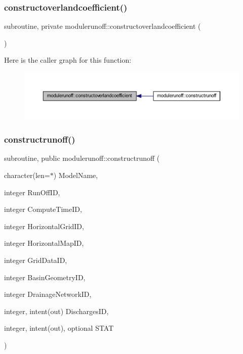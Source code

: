\subsubsection{\texorpdfstring{constructoverlandcoefficient()}{constructoverlandcoefficient()}}
{\footnotesize\ttfamily subroutine, private modulerunoff\+::constructoverlandcoefficient (\begin{DoxyParamCaption}{ }\end{DoxyParamCaption})\hspace{0.3cm}{\ttfamily [private]}}

Here is the caller graph for this function\+:\nopagebreak
\begin{figure}[H]
\begin{center}
\leavevmode
\includegraphics[width=350pt]{namespacemodulerunoff_a9750562ffa96a2b097ee6cfb440440ec_icgraph}
\end{center}
\end{figure}
\mbox{\label{namespacemodulerunoff_afd5b620864c9f62a5b0258956c609766}} 
\subsubsection{\texorpdfstring{constructrunoff()}{constructrunoff()}}
{\footnotesize\ttfamily subroutine, public modulerunoff\+::constructrunoff (\begin{DoxyParamCaption}\item[{character(len=$\ast$)}]{Model\+Name,  }\item[{integer}]{Run\+Off\+ID,  }\item[{integer}]{Compute\+Time\+ID,  }\item[{integer}]{Horizontal\+Grid\+ID,  }\item[{integer}]{Horizontal\+Map\+ID,  }\item[{integer}]{Grid\+Data\+ID,  }\item[{integer}]{Basin\+Geometry\+ID,  }\item[{integer}]{Drainage\+Network\+ID,  }\item[{integer, intent(out)}]{Discharges\+ID,  }\item[{integer, intent(out), optional}]{S\+T\+AT }\end{DoxyParamCaption})}

